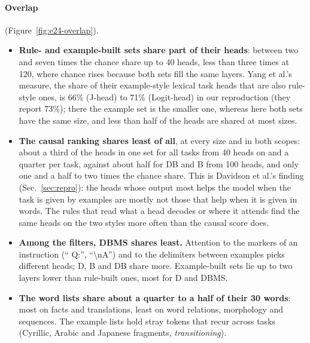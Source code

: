 \documentclass[10pt,a4paper]{article}
\begin{document}
\paragraph{Overlap} (Figure~\ref{fig:e24-overlap}).
\begin{itemize}
\item \textbf{Rule- and example-built sets share part of their heads}: between two and seven times the chance share up to 40 heads, less than three times at 120, where chance rises because both sets fill the same layers. Yang et al.'s measure, the share of their example-style lexical task heads that are also rule-style ones, is 66\% (J-head) to 71\% (Logit-head) in our reproduction (they report 73\%); there the example set is the smaller one, whereas here both sets have the same size, and less than half of the heads are shared at most sizes.
\item \textbf{The causal ranking shares least of all}, at every size and in both scopes: about a third of the heads in one set for all tasks from 40 heads on and a quarter per task, against about half for DB and B from 100 heads, and only one and a half to two times the chance share. This is Davidson et al.'s finding (Sec.~\ref{sec:repro}): the heads whose output most helps the model when the task is given by examples are mostly not those that help when it is given in words. The rules that read what a head decodes or where it attends find the same heads on the two styles more often than the causal score does.
\item \textbf{Among the filters, DBMS shares least.} Attention to the markers of an instruction (`` Q:'', ``\textbackslash nA'') and to the delimiters between examples picks different heads; D, B and DB share more. Example-built sets lie up to two layers lower than rule-built ones, most for D and DBMS.
\item \textbf{The word lists share about a quarter to a half of their 30 words}: most on facts and translations, least on word relations, morphology and sequences. The example lists hold stray tokens that recur across tasks (Cyrillic, Arabic and Japanese fragments, \emph{transitioning}).
\end{itemize}
\end{document}
